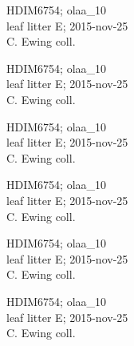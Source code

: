 \documentclass[2pt]{extarticle}
\begin{document}
\noindent
\parbox{0.16\textwidth}{\tiny \raggedright \rule[-0.3\baselineskip]{0pt}{10pt}HDIM6754; olaa\_10\\ leaf litter E; 2015-nov-25\\ C. Ewing coll.}
\parbox{0.16\textwidth}{\tiny \raggedright \rule[-0.3\baselineskip]{0pt}{10pt}HDIM6754; olaa\_10\\ leaf litter E; 2015-nov-25\\ C. Ewing coll.}
\parbox{0.16\textwidth}{\tiny \raggedright \rule[-0.3\baselineskip]{0pt}{10pt}HDIM6754; olaa\_10\\ leaf litter E; 2015-nov-25\\ C. Ewing coll.}
\parbox{0.16\textwidth}{\tiny \raggedright \rule[-0.3\baselineskip]{0pt}{10pt}HDIM6754; olaa\_10\\ leaf litter E; 2015-nov-25\\ C. Ewing coll.}
\parbox{0.16\textwidth}{\tiny \raggedright \rule[-0.3\baselineskip]{0pt}{10pt}HDIM6754; olaa\_10\\ leaf litter E; 2015-nov-25\\ C. Ewing coll.}
\parbox{0.16\textwidth}{\tiny \raggedright \rule[-0.3\baselineskip]{0pt}{10pt}HDIM6754; olaa\_10\\ leaf litter E; 2015-nov-25\\ C. Ewing coll.}
\end{document}
